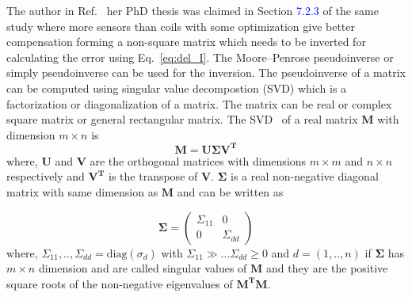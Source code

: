 
\FloatBarrier
The author in Ref.~\cite{bea} her PhD thesis was claimed in Section \textcolor{blue}{7.2.3} of the same study where more sensors than coils with some optimization give better compensation forming a non-square matrix which needs to be inverted for calculating the error using Eq.~\ref{eq:del_I}. The Moore--Penrose pseudoinverse \cite{pseudo} or simply pseudoinverse can be used for the inversion. The pseudoinverse of a matrix can be computed using singular value decompostion (SVD) which is a factorization or diagonalization of a matrix. The matrix can be real or complex square matrix or general rectangular matrix. The SVD~\cite{svd2,svd3} of a real matrix $\bm{M}$ with dimension $m \times n$ is 
\begin{equation}\label{eq:m}
        \bm{M} = \bm{U} \bm{\Sigma} \bm{V^T}
\end{equation}
where, $\bm{U}$ and $\bm{V}$ are the orthogonal matrices with dimensions $m \times m$ and $n \times n$ respectively and $\bm{V^T}$ is the transpose of $\bm{V}$. $\bm{\Sigma}$ is a real non-negative diagonal matrix with same dimension as  $\bm{M}$ and can be written as

\begin{equation*}
\bm{\Sigma} = \begin{pmatrix} 
\Sigma_{11} & 0 \\
0 & \Sigma_{dd} 
\end{pmatrix}
\end{equation*}
where, $\Sigma_{11},..,\Sigma_{dd}=\text{diag}(\sigma_d)$ with $\Sigma_{11}\gg... \Sigma_{dd}\geq0$ and $d=(1,..,n)$ if $\bm{\Sigma}$ has $m \times n$ dimension and are called singular values of $\bm{M}$  and they are the positive square roots of the non-negative eigenvalues of $\bm{M^T}\bm{M}$.

